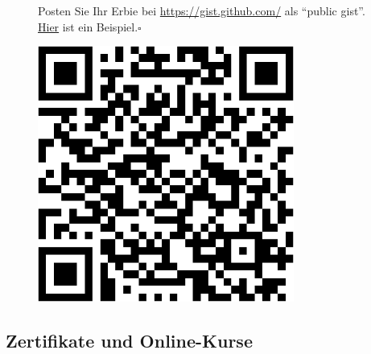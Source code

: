 \documentclass[
  a4paper,
]{scrbook}
\theoremstyle{definition}
\theoremstyle{definition}
\theoremstyle{definition}
\theoremstyle{remark}
\begin{document}
\begin{tcolorbox}[enhanced jigsaw, colbacktitle=quarto-callout-tip-color!10!white, bottomrule=.15mm, left=2mm, breakable, rightrule=.15mm, coltitle=black, title=\textcolor{quarto-callout-tip-color}{\faLightbulb}\hspace{0.5em}{Tipp}, colback=white, leftrule=.75mm, titlerule=0mm, opacityback=0, bottomtitle=1mm, toprule=.15mm, arc=.35mm, toptitle=1mm, opacitybacktitle=0.6, colframe=quarto-callout-tip-color-frame]

\begin{figure}[H]

\begin{minipage}{0.80\linewidth}
Posten Sie Ihr Erbie bei \url{https://gist.github.com/} als ``public
gist''.
\href{https://gist.github.com/sebastiansauer/0649a0453b5cc7c6a1d16ac760667215}{Hier}
ist ein Beispiel.\(\square\)\end{minipage}%
%
\begin{minipage}{0.20\linewidth}

\begin{center}
\includegraphics[width=0.75\textwidth,height=\textheight]{030-aufbereiten_files/figure-pdf/unnamed-chunk-49-1.pdf}
\end{center}

\end{minipage}%

\end{figure}%

\end{tcolorbox}

\subsection{Zertifikate und
Online-Kurse}\label{zertifikate-und-online-kurse}
\end{document}
